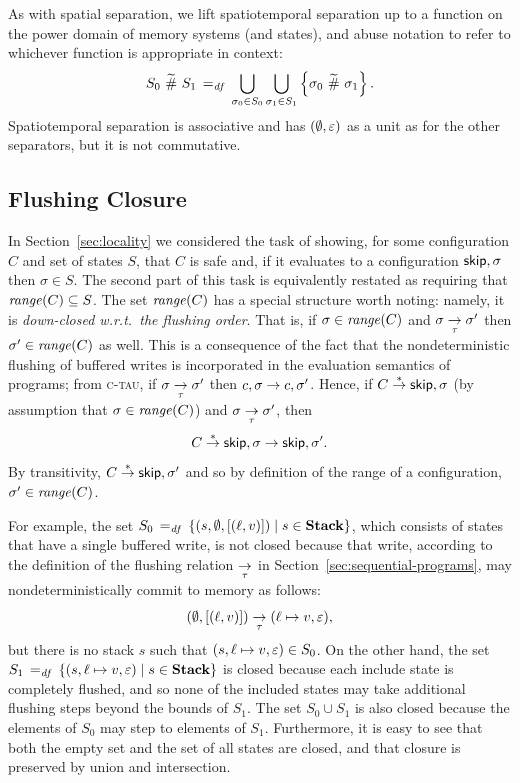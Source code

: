\documentclass[11pt]{report}         %
\begin{document}
As with spatial separation, we lift spatiotemporal separation up to a function on the power domain of memory systems (and states), and abuse notation to refer to whichever function is appropriate in context: \[ S_0 \operatorname{\,\widetilde{\#}\,} S_1 \operatorname{\;=_{\mathit{df}}\;} \bigcup_{\sigma_0 \in S_0} \bigcup_{\sigma_1 \in S_1} \left\lbrace \sigma_0 \operatorname{\,\widetilde{\#}\,} \sigma_1 \right\rbrace.\] Spatiotemporal separation is associative and has $(\operatorname{\emptyset},\varepsilon)$ as a unit as for the other separators, but it is not commutative. 


\subsection{Flushing Closure}
\label{sec:uniprocessor-predicates}

In Section~\ref{sec:locality} we considered the task of showing, for some configuration $C$ and set of states $S$, that $C$ is safe and, if it evaluates to a configuration $\operatorname{\mathsf{skip}},\sigma$ then $\sigma \in S$. The second part of this task is equivalently restated as requiring that $\mathit{range}(C) \subseteq S$. The set $\mathit{range}(C)$ has a special structure worth noting: namely, it is \emph{down-closed w.r.t.\ the flushing order}. That is, if $\sigma \in \mathit{range}(C)$ and $\sigma \underset{\tau}{\rightarrow} \sigma'$ then $\sigma' \in \mathit{range}(C)$ as well. This is a consequence of the fact that the nondeterministic flushing of buffered writes is incorporated in the evaluation semantics of programs; from \textsc{c-tau}, if $\sigma \underset{\tau}{\rightarrow} \sigma'$ then $c,\sigma \rightarrow c,\sigma'$. Hence, if $C \stackrel{\ast}{\rightarrow} \operatorname{\mathsf{skip}},\sigma$ (by assumption that $\sigma \in \mathit{range}(C)$) and $\sigma \underset{\tau}{\rightarrow} \sigma'$, then \[ C \stackrel{\ast}{\rightarrow} \operatorname{\mathsf{skip}},\sigma \rightarrow \operatorname{\mathsf{skip}},\sigma'.\] By transitivity, $C \stackrel{\ast}{\rightarrow} \operatorname{\mathsf{skip}},\sigma'$ and so by definition of the range of a configuration, $\sigma' \in \mathit{range}(C)$. 
  
For example, the set $S_0 \operatorname{\;=_{\mathit{df}}\;} \left\lbrace (s,\operatorname{\emptyset},\left[(\ell,v)\right]) \mid s \in \mathbf{Stack} \right\rbrace$, which consists of states that have a single buffered write, is not closed because that write, according to the definition of the flushing relation $\underset{\tau}{\rightarrow}$ in Section~\ref{sec:sequential-programs}, may nondeterministically commit to memory as follows: \[(\operatorname{\emptyset},\left[(\ell,v)\right]) \underset{\tau}{\rightarrow} (\ell \mapsto v,\varepsilon),\] but there is no stack $s$ such that $(s, \ell \mapsto v, \varepsilon) \in S_0$. On the other hand, the set $S_1 \operatorname{\;=_{\mathit{df}}\;} \left\lbrace (s,\ell \mapsto v,\varepsilon) \mid s \in \mathbf{Stack} \right\rbrace$ is closed because each include state is completely flushed, and so none of the included states may take additional flushing steps beyond the bounds of $S_1$. The set $S_0 \cup S_1$ is also closed because the elements of $S_0$ may step to elements of $S_1$. Furthermore, it is easy to see that both the empty set and the set of all states are closed, and that closure is preserved by union and intersection. 
\end{document}
